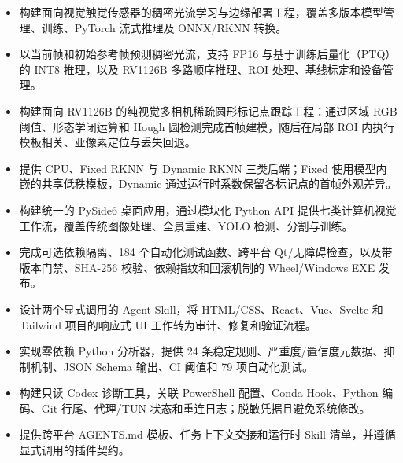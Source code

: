 \begin{itemize}
\cvprojectbodyfont
    \item 构建面向视觉触觉传感器的稠密光流学习与边缘部署工程，覆盖多版本模型管理、训练、PyTorch 流式推理及 ONNX/RKNN 转换。
    \item 以当前帧和初始参考帧预测稠密光流，支持 FP16 与基于训练后量化（PTQ）的 INT8 推理，以及 RV1126B 多路顺序推理、ROI 处理、基线标定和设备管理。
\end{itemize}

\begin{itemize}
\cvprojectbodyfont
    \item 构建面向 RV1126B 的纯视觉多相机稀疏圆形标记点跟踪工程：通过区域 RGB 阈值、形态学闭运算和 Hough 圆检测完成首帧建模，随后在局部 ROI 内执行模板相关、亚像素定位与丢失回退。
    \item 提供 CPU、Fixed RKNN 与 Dynamic RKNN 三类后端；Fixed 使用模型内嵌的共享低秩模板，Dynamic 通过运行时系数保留各标记点的首帧外观差异。
\end{itemize}

\begin{itemize}
\cvprojectbodyfont
    \item 构建统一的 PySide6 桌面应用，通过模块化 Python API 提供七类计算机视觉工作流，覆盖传统图像处理、全景重建、YOLO 检测、分割与训练。
    \item 完成可选依赖隔离、184 个自动化测试函数、跨平台 Qt/无障碍检查，以及带版本门禁、SHA-256 校验、依赖指纹和回滚机制的 Wheel/Windows EXE 发布。
\end{itemize}

\begin{itemize}
\cvprojectbodyfont
    \item 设计两个显式调用的 Agent Skill，将 HTML/CSS、React、Vue、Svelte 和 Tailwind 项目的响应式 UI 工作转为审计、修复和验证流程。
    \item 实现零依赖 Python 分析器，提供 24 条稳定规则、严重度/置信度元数据、抑制机制、JSON Schema 输出、CI 阈值和 79 项自动化测试。
\end{itemize}

\begin{itemize}
\cvprojectbodyfont
    \item 构建只读 Codex 诊断工具，关联 PowerShell 配置、Conda Hook、Python 编码、Git 行尾、代理/TUN 状态和重连日志；脱敏凭据且避免系统修改。
    \item 提供跨平台 AGENTS.md 模板、任务上下文交接和运行时 Skill 清单，并遵循显式调用的插件契约。
\end{itemize}
